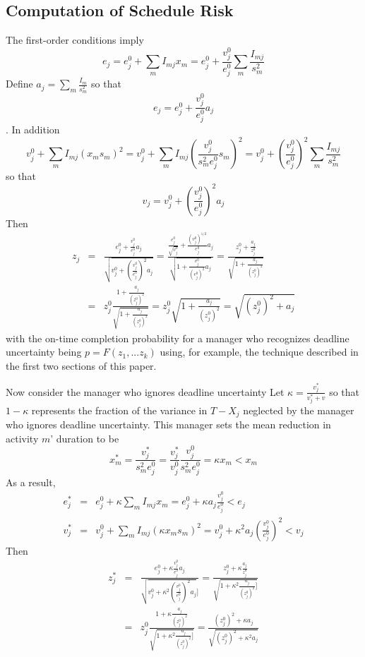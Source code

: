 \documentclass[11pt]{article}
\begin{document}
\subsection{Computation of Schedule Risk}
The first-order conditions imply $$e_j=e^0_j+\sum_m I_{mj} x_m = e^0_j +\frac{v^0_j}{e^0_j} \sum_m \frac{I_{mj}}{s^2_m} $$
Define $a_j=\sum_m \frac{I_m}{s^2_m}$ so that $$e_j=e^0_j + \frac{v^0_j}{e^0_j} a_j$$. In addition
$$ v^0_j + \sum_m I_{mj} (x_m s_m)^2 = v^0_j + \sum_m I_{mj} (\frac{v^0_j}{s^2_m e^0_j} s_m)^2 =
v^0_j + (\frac{v^0_j}{e^0_j})^2 \sum_m \frac{I_{mj}}{s^2_m} $$ so that
$$v_j= v^0_j + (\frac{v^0_j}{e^0_j})^2 a_j $$ 
Then
\begin{eqnarray*}
z_j &=& \frac{e^0_j + \frac{v^0_j}{e^0_j} a_j}{\sqrt{v^0_j+(\frac{v^0_j}{e^0_j})^2 a_j }} 
= \frac{\frac{e^0_j}{\sqrt{v^0_j}} + \frac{(v^0_j)^{1/2}}{e^0_j} a_j}{\sqrt{1+ \frac{v^0_j}{(e^0_j)^2} a_j }} 
= \frac{ z^0_j + \frac{a_j}{z^0_j}}{\sqrt{1+ \frac{a_j}{(z^0_j)^2}}}  \\
&=& z^0_j \frac{1 + \frac{a_j}{(z^0_j)^2}}{\sqrt{1+ \frac{a_j}{(z^0_j)^2}}} 
= z^0_j \sqrt{1 + \frac{a_j}{(z^0_j)^2}}   
=   \sqrt{(z^0_j)^2 + a_j}
\end{eqnarray*}
with the on-time completion probability for a manager who recognizes deadline uncertainty being  
$p=F(z_1,...z_k)$ using, for example, the technique described in the first two sections of this paper.  \par  
Now consider the manager who ignores deadline uncertainty
 Let $\kappa=
\frac{v^*_j}{v^*_j+v}$ so that $1-\kappa$ represents the fraction of the variance in $T-X_j$ neglected by the manager who ignores deadline uncertainty.   This manager sets the mean reduction in activity $m$' duration to be
$$x^*_m=\frac{v^*_j}{s^2_m e^0_j}=\frac{v^*_j}{v^0_j} \frac{v^0_j}{s^2_m e^0_j} =  \kappa x_m < x_m$$
As a result, 
\begin{eqnarray*}
e^*_j &=& e^0_j+\kappa \sum_m I_{mj} x_m = e^0_j + \kappa a_j \frac{v^0_j}{e^0_j} < e_j \\
 v^*_j &=& v^0_j + \sum_m I_{mj} (\kappa x_m s_m)^2 = v^0_j + \kappa^2 a_j (\frac{v^0_j}{e^0_j})^2 < v_j 
 \end{eqnarray*}
 Then
\begin{eqnarray*}
z^*_j &=& \frac{e^0_j + \kappa \frac{v^0_j}{e^0_j} a_j}{\sqrt{v^0_j+\kappa^2(\frac{v^0_j}{e^0_j})^2 a_j }]} 
= \frac{ z^0_j + \kappa \frac{a_j}{z^0_j}}{\sqrt{1+ \kappa^2 \frac{a_j}{(z^0_j)^2}]}}   \\
&=& z^0_j \frac{1 + \kappa \frac{a_j}{(z^0_j)^2}}{\sqrt{1+ \kappa^2 \frac{a_j}{(z^0_j)^2}]}} 
=  \frac{(z^0_j)^2 + \kappa a_j}{\sqrt{(z^0_j)^2+ \kappa^2 a_j }}  
\end{eqnarray*}
\end{document}
